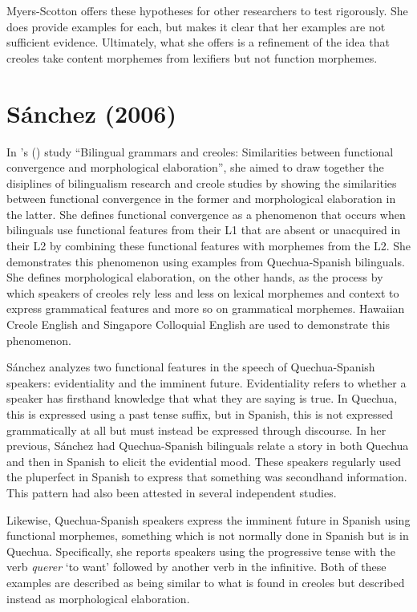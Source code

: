 \documentclass{article}
\newcommand{\lexi}[1]{\textit{#1}}
\newcommand{\gloss}[1]{`#1'}
\newcommand{\titl}[1]{``#1''}
\begin{document}
    Myers-Scotton offers these hypotheses for other researchers to test rigorously.
    She does provide examples for each, but makes it clear that her examples are not sufficient evidence.
    Ultimately, what she offers is a refinement of the idea that creoles take content morphemes from lexifiers but not function morphemes.

  \section{Sánchez (2006)}
    In \citeauthor{lefebvre_bilingual_2006}'s (\citeyear{lefebvre_bilingual_2006}) study \titl{Bilingual grammars and creoles: Similarities between functional convergence and morphological elaboration}, she aimed to draw together the disiplines of bilingualism research and creole studies by showing the similarities between functional convergence in the former and morphological elaboration in the latter.
    She defines functional convergence as a phenomenon that occurs when bilinguals use functional features from their L1 that are absent or unacquired in their L2 by combining these functional features with morphemes from the L2.
    She demonstrates this phenomenon using examples from Quechua-Spanish bilinguals.
    She defines morphological elaboration, on the other hands, as the process by which speakers of creoles rely less and less on lexical morphemes and context to express grammatical features and more so on grammatical morphemes.
    Hawaiian Creole English and Singapore Colloquial English are used to demonstrate this phenomenon.

    Sánchez analyzes two functional features in the speech of Quechua-Spanish speakers: evidentiality and the imminent future.
    Evidentiality refers to whether a speaker has firsthand knowledge that what they are saying is true.
    In Quechua, this is expressed using a past tense suffix, but in Spanish, this is not expressed grammatically at all but must instead be expressed through discourse.
    In her previous, Sánchez had Quechua-Spanish bilinguals relate a story in both Quechua and then in Spanish to elicit the evidential mood.
    These speakers regularly used the pluperfect in Spanish to express that something was secondhand information.
    This pattern had also been attested in several independent studies.

    Likewise, Quechua-Spanish speakers express the imminent future in Spanish using functional morphemes, something which is not normally done in Spanish but is in Quechua.
    Specifically, she reports speakers using the progressive tense with the verb \lexi{querer} \gloss{to want} followed by another verb in the infinitive.
    Both of these examples are described as being similar to what is found in creoles but described instead as morphological elaboration.
\end{document}
